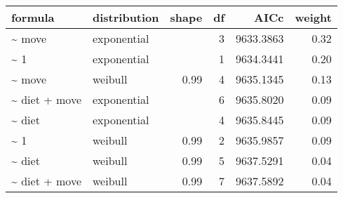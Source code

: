 \begin{table}[ht]
\centering
\begin{tabular}{llrrrr}
 formula & distribution & shape & df & AICc & weight \\ 
  \hline
\~{} move & exponential &  & 3 & 9633.3863 & 0.32 \\ 
  \~{} 1 & exponential &  & 1 & 9634.3441 & 0.20 \\ 
  \~{} move & weibull & 0.99 & 4 & 9635.1345 & 0.13 \\ 
  \~{} diet + move & exponential &  & 6 & 9635.8020 & 0.09 \\ 
  \~{} diet & exponential &  & 4 & 9635.8445 & 0.09 \\ 
  \~{} 1 & weibull & 0.99 & 2 & 9635.9857 & 0.09 \\ 
  \~{} diet & weibull & 0.99 & 5 & 9637.5291 & 0.04 \\ 
  \~{} diet + move & weibull & 0.99 & 7 & 9637.5892 & 0.04 \\ 
  \end{tabular}
\label{tab:na}
\end{table}
